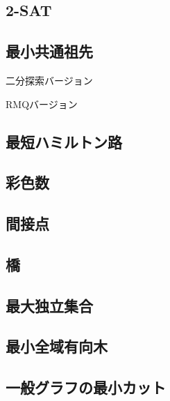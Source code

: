 \subsection{2-SAT}


\subsection{最小共通祖先}
二分探索バージョン

RMQバージョン


\subsection{最短ハミルトン路}


\subsection{彩色数}


\subsection{間接点}


\subsection{橋}


\subsection{最大独立集合}


\subsection{最小全域有向木}


\subsection{一般グラフの最小カット}

